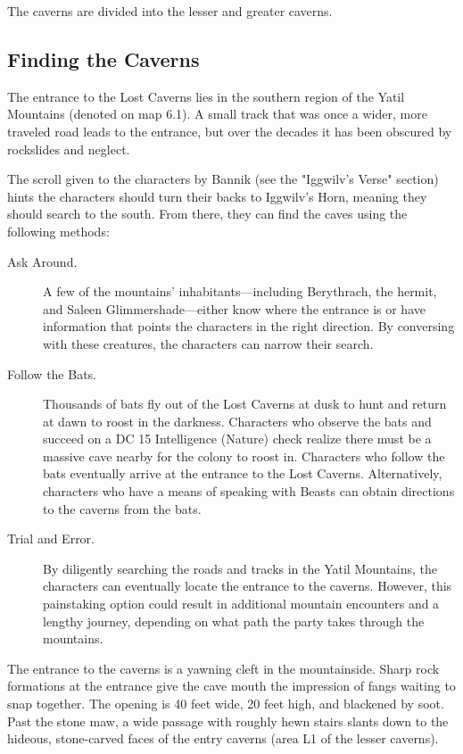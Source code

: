 \documentclass[10pt,a4paper,twoside,bg=print,twocolumn,openany,nodeprecatedcode]{dndbook}
\begin{document}
The caverns are divided into the lesser and greater caverns.

\subsection{Finding the Caverns}
The entrance to the Lost Caverns lies in the southern region of the Yatil Mountains (denoted on map 6.1). A small track that was once a wider, more traveled road leads to the entrance, but over the decades it has been obscured by rockslides and neglect.

The scroll given to the characters by Bannik (see the "Iggwilv's Verse" section) hints the characters should turn their backs to Iggwilv's Horn, meaning they should search to the south. From there, they can find the caves using the following methods:


\begin{description}
\item[Ask Around.]
A few of the mountains' inhabitants—including Berythrach, the hermit, and Saleen Glimmershade—either know where the entrance is or have information that points the characters in the right direction. By conversing with these creatures, the characters can narrow their search.
\item[Follow the Bats.]
Thousands of bats fly out of the Lost Caverns at dusk to hunt and return at dawn to roost in the darkness. Characters who observe the bats and succeed on a DC 15 Intelligence (Nature) check realize there must be a massive cave nearby for the colony to roost in. Characters who follow the bats eventually arrive at the entrance to the Lost Caverns. Alternatively, characters who have a means of speaking with Beasts can obtain directions to the caverns from the bats.
\item[Trial and Error.]
By diligently searching the roads and tracks in the Yatil Mountains, the characters can eventually locate the entrance to the caverns. However, this painstaking option could result in additional mountain encounters and a lengthy journey, depending on what path the party takes through the mountains.
\end{description}

The entrance to the caverns is a yawning cleft in the mountainside. Sharp rock formations at the entrance give the cave mouth the impression of fangs waiting to snap together. The opening is 40 feet wide, 20 feet high, and blackened by soot. Past the stone maw, a wide passage with roughly hewn stairs slants down to the hideous, stone-carved faces of the entry caverns (area L1 of the lesser caverns).
\end{document}
